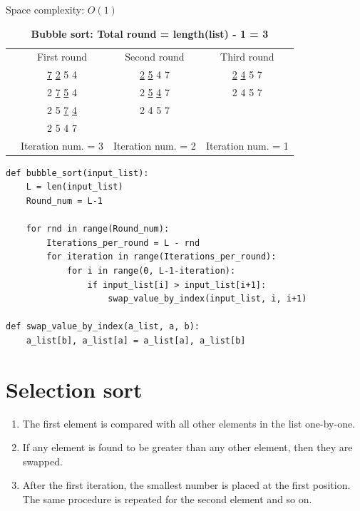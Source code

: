 \documentclass[a4paper,11pt]{book}
\begin{document}
\noindent Space complexity: $O(1)$

\begin{table}[ht]
	\label{Bubble sort}
	\caption{\textbf{Bubble sort: Total round = length(list) - 1 = 3}}
	\vspace{2mm}
	\centering
	\begin{tabular}{cccc}
		&{First round}  &{Second round}  &{Third round}   \\
		&\underline{7} \underline{2} 5 4  &\underline{2} \underline{5} 4 7&\underline{2} \underline{4} 5 7\\
		
		&2 \underline{7} \underline{5} 4&2 \underline{5} \underline{4} 7  &2 4 5 7   \\
		&2 5 \underline{7} \underline{4}  &2 4 5 7 &   \\
		&2 5 4 7  & &\\
		&Iteration num. = 3 &Iteration num. = 2 &Iteration num. = 1 
	\end{tabular}
\end{table}

% 
\begin{lstlisting}
def bubble_sort(input_list):
	L = len(input_list)
	Round_num = L-1

	for rnd in range(Round_num):
		Iterations_per_round = L - rnd
		for iteration in range(Iterations_per_round):
			for i in range(0, L-1-iteration):
				if input_list[i] > input_list[i+1]:
					swap_value_by_index(input_list, i, i+1)

def swap_value_by_index(a_list, a, b):
    a_list[b], a_list[a] = a_list[a], a_list[b]
\end{lstlisting}

\newpage
\section{Selection sort}

\begin{enumerate}
	\item The first element is compared with all other elements in the list one-by-one.
	\item If any element is found to be greater than any other element, then they are swapped.
	\item After the first iteration, the smallest number is placed at the first position. The same procedure is repeated for the second element and so on.
\end{enumerate}
\end{document}
